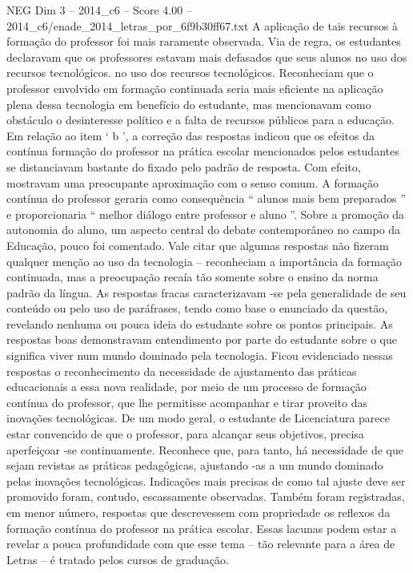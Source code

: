 \begin{textsample}{NEG Dim 3 – 2014\_c6 – Score 4.00 – 2014\_c6/enade\_2014\_letras\_por\_6f9b30ff67.txt}
A aplicação de tais recursos à formação do professor foi mais raramente observada.
Via de regra, os estudantes declaravam que os professores estavam mais defasados que seus alunos no uso dos recursos tecnológicos. no uso dos recursos tecnológicos.
Reconheciam que o professor envolvido em formação continuada seria mais eficiente na aplicação plena dessa tecnologia em benefício do estudante, mas mencionavam como obstáculo o desinteresse político e a falta de recursos públicos para a educação.
Em relação ao item ‘ b ’, a correção das respostas indicou que os efeitos da contínua formação do professor na prática escolar mencionados pelos estudantes se distanciavam bastante do fixado pelo padrão de resposta.
Com efeito, mostravam uma preocupante aproximação com o senso comum.
A formação contínua do professor geraria como consequência “ alunos mais bem preparados ” e proporcionaria “ melhor diálogo entre professor e aluno ”.
Sobre a promoção da autonomia do aluno, um aspecto central do debate contemporâneo no campo da Educação, pouco foi comentado.
Vale citar que algumas respostas não fizeram qualquer menção ao uso da tecnologia – reconheciam a importância da formação continuada, mas a preocupação recaía tão somente sobre o ensino da norma padrão da língua.
As respostas fracas caracterizavam -se pela generalidade de seu conteúdo ou pelo uso de paráfrases, tendo como base o enunciado da questão, revelando nenhuma ou pouca ideia do estudante sobre os pontos principais.
As respostas boas demonstravam entendimento por parte do estudante sobre o que significa viver num mundo dominado pela tecnologia.
Ficou evidenciado nessas respostas o reconhecimento da necessidade de ajustamento das práticas educacionais a essa nova realidade, por meio de um processo de formação contínua do professor, que lhe permitisse acompanhar e tirar proveito das inovações tecnológicas.
De um modo geral, o estudante de Licenciatura parece estar convencido de que o professor, para alcançar seus objetivos, precisa aperfeiçoar -se continuamente.
Reconhece que, para tanto, há necessidade de que sejam revistas as práticas pedagógicas, ajustando -as a um mundo dominado pelas inovações tecnológicas.
Indicações mais precisas de como tal ajuste deve ser promovido foram, contudo, escassamente observadas.
Também foram registradas, em menor número, respostas que descrevessem com propriedade os reflexos da formação contínua do professor na prática escolar.
Essas lacunas podem estar a revelar a pouca profundidade com que esse tema – tão relevante para a área de Letras – é tratado pelos cursos de graduação.

\end{textsample}
